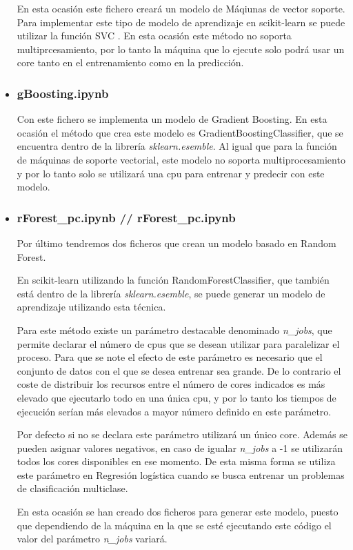 \documentclass[a4paper, 12pt]{book}
\begin{document}
\begin{itemize}
En esta ocasión este fichero creará un modelo de Máqiunas de vector soporte. Para implementar este tipo de modelo de aprendizaje en scikit-learn se puede utilizar la función SVC \cite{SVMDocumentation}. En esta ocasión este método no soporta multiprcesamiento, por lo tanto la máquina que lo ejecute solo podrá usar un core tanto en el entrenamiento como en la predicción. 

\item \subsubsection{gBoosting.ipynb} 
\label{subsubsub:gBoosting}

Con este fichero se implementa un modelo de Gradient Boosting. En esta ocasión el método que crea este modelo es GradientBoostingClassifier\cite{GradientTreeBDoc}, que se encuentra dentro de la librería \textit{sklearn.esemble}. Al igual que para la función de máquinas de soporte vectorial, este modelo no soporta multiprocesamiento y por lo tanto solo se utilizará una cpu para entrenar y predecir con este modelo. 
\item \subsubsection{rForest\_pc.ipynb // rForest\_pc.ipynb} 
\label{subsubsub:rForest}

Por último tendremos dos ficheros que crean un modelo basado en Random Forest.

En scikit-learn utilizando la función RandomForestClassifier\cite{RandomForestDoc}, que también está dentro de la librería \textit{sklearn.esemble}, se puede generar un modelo de aprendizaje utilizando esta técnica.

Para este método existe un parámetro destacable denominado \textit{n\_jobs}, que permite declarar el número de cpus que se desean utilizar para paralelizar el proceso. Para que se note el efecto de este parámetro es necesario que el conjunto de datos con el que se desea entrenar sea grande. De lo contrario el coste de distribuir los recursos entre el número de cores indicados es más elevado que ejecutarlo todo en una única cpu, y por lo tanto los tiempos de ejecución serían más elevados a mayor número definido en este parámetro.

Por defecto si no se declara este parámetro utilizará un único core. Además se pueden asignar valores negativos, en caso de igualar \textit{n\_jobs} a -1 se utilizarán todos los cores disponibles en ese momento. De esta misma forma se utiliza este parámetro en Regresión logística cuando se busca entrenar un problemas de clasificación multiclase.

En esta ocasión se han creado dos ficheros para generar este modelo, puesto que dependiendo de la máquina en la que se esté ejecutando este código el valor del parámetro \textit{n\_jobs} variará. 

\end{itemize}
\end{document}
